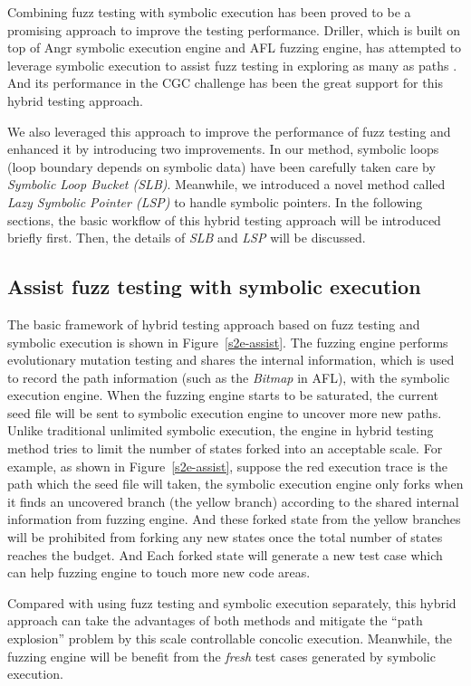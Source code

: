 Combining fuzz testing with symbolic execution has been proved to be a promising approach to improve the testing performance. Driller, which is built on top of Angr symbolic execution engine and AFL fuzzing engine, has attempted to leverage symbolic execution to assist fuzz testing in exploring as many as paths \cite{stephens2016driller}. And its performance in the CGC challenge \cite{online:CGC} has been the great support for this hybrid testing approach. 

We also leveraged this approach to improve the performance of fuzz testing and enhanced it by introducing two improvements. In our method, symbolic loops (loop boundary depends on symbolic data) have been carefully taken care by \textit{Symbolic Loop Bucket (SLB)}. Meanwhile, we introduced a novel method called \textit{Lazy Symbolic Pointer (LSP)} to handle symbolic pointers. In the following sections, the basic workflow of this hybrid testing approach will be introduced briefly first. Then, the details of \textit{SLB} and \textit{LSP} will be discussed.

\subsection{Assist fuzz testing with symbolic execution}
The basic framework of hybrid testing approach based on fuzz testing and symbolic execution is shown in Figure~\ref{s2e-assist}. The fuzzing engine performs evolutionary mutation testing and shares the internal information, which is used to record the path information (such as the \textit{Bitmap} in AFL), with the symbolic execution engine. 
When the fuzzing engine starts to be saturated, the current seed file will be sent to symbolic execution engine to uncover more new paths. 
Unlike traditional unlimited symbolic execution, the engine in hybrid testing method tries to limit the number of states forked into an acceptable scale. For example, as shown in Figure~\ref{s2e-assist}, suppose the red execution trace is the path which the seed file will taken, the symbolic execution engine only forks when it finds an uncovered branch (the yellow branch) according to the shared internal information from fuzzing engine. And these forked state from the yellow branches will be prohibited from forking any new states once the total number of states reaches the budget. And Each forked state will generate a new test case which can help fuzzing engine to touch more new code areas. 

Compared with using fuzz testing and symbolic execution separately, this hybrid approach can take the advantages of both methods and mitigate the ``path explosion'' problem by this scale controllable concolic execution. Meanwhile, the fuzzing engine will be benefit from the \textit{fresh} test cases generated by symbolic execution.

